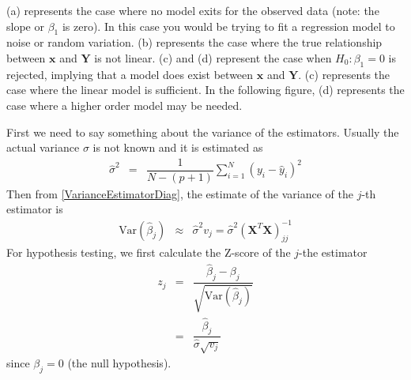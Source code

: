 \documentclass[11pt]{article}
\theoremstyle{remark}
\begin{document}
\begin{figure}[h]
      \end{figure}

(a) represents the case where no model exits for the observed data (note: the slope or $\beta_1$ is zero). In this case you would be trying to fit a regression model to noise or random variation. (b) represents the case where the true relationship between $\mathbf{x}$ and $\mathbf{Y}$ is not linear. (c) and (d) represent the case when $H_0: \beta_1 = 0$ is rejected, implying that a model does exist between $\mathbf{x}$ and $\mathbf{Y}$. (c) represents the case where the linear model is sufficient. In the following figure, (d) represents the case where a higher order model may be needed.

First we need to say something about the variance of the estimators. Usually the actual variance $\sigma$ is not known and it is estimated as
\begin{eqnarray}
\hat{\sigma}^2 &=&\dfrac{1}{N-(p+1)}\sum_{i=1}^N(y_i-\hat{y}_i)^2
\end{eqnarray}
Then from \eqref{VarianceEstimatorDiag}, the estimate of the variance of the $j$-th estimator is
\begin{eqnarray}
\text{Var}(\hat{\beta}_j) &\approx& \hat{\sigma}^2 v_j = \hat{\sigma}^2 \left(\mathbf{X}^T\mathbf{X}\right)^{-1}_{jj}\label{VarianceEstimatorDiagEstimate}
\end{eqnarray}
For hypothesis testing, we first calculate the Z-score of the $j$-the estimator
\begin{eqnarray}
z_j &=&\dfrac{\hat{\beta}_j - \beta_j}{\sqrt{\text{Var}(\hat{\beta}_j)}}\nonumber\\
&=&\dfrac{\hat{\beta}_j}{\hat{\sigma} \sqrt{v_j}}
\end{eqnarray}
since $\beta_j = 0$ (the null hypothesis).
\end{document}
